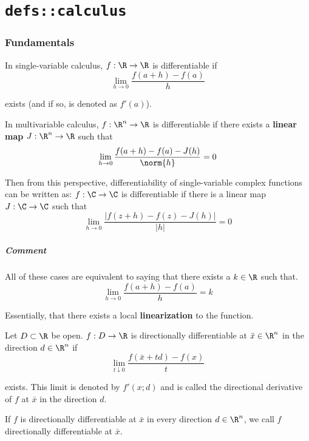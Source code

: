 \chapter{\texttt{defs::calculus}}\label{a882de0}

\begin{toc}
\end{toc}

\subsection{Fundamentals}\label{a56304f}

\label{c62315d}

In single-variable calculus, $f:\R\to\R$ is differentiable if
$$
  \lim_{h\to0}\frac{f(a+h)-f(a)}h
$$

exists (and if so, is denoted as $f'(a)$).

In multivariable calculus, $f:\R^n\to\R$ is differentiable if there exists a
\textbf{linear map} $J:\R^n\to\R$ such that
$$
  \lim_{h\to0}\frac{f(a+h)-f(a)-J(h)}{\norm{h}}=0
$$

Then from this perspective, differentiability of single-variable complex
functions can be written as: $f:\C\to\C$ is differentiable if there is a linear
map $J:\C\to\C$ such that
$$
  \lim_{h\to0}\frac{|f(z+h)-f(z)-J(h)|}{|h|}=0
$$

\paragraph{Comment}

All of these cases are equivalent to saying that there exists a $k\in\R$ such
that.
$$
  \lim_{h\to0}\frac{f(a+h)-f(a)}h=k
$$

Essentially, that there exists a local \textbf{linearization} to the function.

\label{dbbf530}

Let $D\subset \R$ be open. $f:D\to\R$ is directionally differentiable at $\bar
x\in\R^n$ in the direction $d\in\R^n$ if
$$
  \lim_{t\downarrow0}\frac{f(\bar x+td)-f(x)}t
$$

exists. This limit is denoted by $f'(x;d)$ and is called the directional
derivative of $f$ at $\bar x$ in the direction $d$.

If $f$ is directionally differentiable at $\bar x$ in every direction
$d\in\R^n$, we call $f$ directionally differentiable at $\bar x$.

